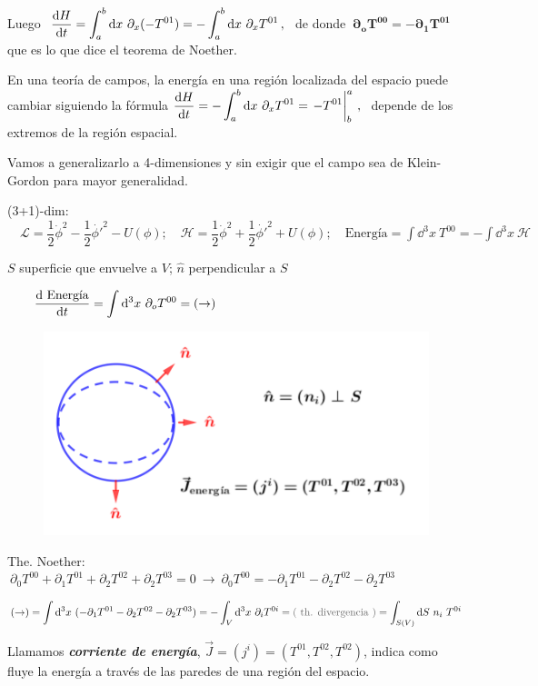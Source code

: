 Luego $\displaystyle \ \dv{H}{t}=\int _a^b \dd x \ \partial_x (-T^{01})=-\int_a^b \dd x \ \partial_x T^{01}\, , \ $ de donde $\ \boldsymbol{\partial_o T^{00} = -\partial_1 T^{01}}$ que es lo que dice el teorema de Noether.

En una teoría de campos, la energía en una región localizada del espacio puede cambiar siguiendo la fórmula $\displaystyle \dv{H}{t}=-\int_a^b \dd x \ \partial_x T^{01} =\eval{-T^{01}}_b^a\, , \ $ depende de los extremos de la región espacial.

\vspace{1cm} Vamos a generalizarlo a 4-dimensiones y sin exigir que el campo sea de Klein-Gordon para mayor generalidad.

(3+1)-dim: $\quad \displaystyle \mathcal L=\dfrac 1 2 \dot \phi^2 - \dfrac 1 2  \dot{\phi'}^2-U(\phi);\quad \mathcal H=\dfrac 1 2 \dot \phi^2 + \dfrac 1 2  \dot{\phi'}^2+U(\phi); \quad \text{Energía}=\int \dd^3x \ T^{00}=-\int \dd^3 x \ \mathcal H$

\begin{multicols}{2}

$S$ superficie que envuelve a $V$; $\hat n$ perpendicular a $S$

$\qquad \displaystyle \dv{\text{ Energía}}{t}=\int \dd^3 x \ \partial_o T^{00}= (\to)$
\begin{figure}[H]
	\centering
	\includegraphics[width=.4\textwidth]{imagenes/img34-04.png}
\end{figure}
\end{multicols}

The. Noether: $\ \partial_0 T^{00}+\partial_1 T^{01}+\partial_2 T^{02}+\partial_2 T^{03} = 0 \ \to \ \partial_0 T^{00} = -\partial_1 T^{01}-\partial_2 T^{02}-\partial_2 T^{03}$

$\displaystyle (\to)= \int \dd^3 x \ ( -\partial_1 T^{01}-\partial_2 T^{02}-\partial_2 T^{03} ) = - \int_V \dd^3 x \ \partial_i T^{0i} = \textcolor{gris}{(\ \text{th. divergencia} \ )} = \int_{S(V)} \dd S \ n_i \ T^{0i}$

Llamamos \emph{\textbf{corriente de energía}}, $\vec J=(j^i)=(T^{01},T^{02},T^{02})$, indica como fluye la energía a través de las paredes de una región del espacio.

